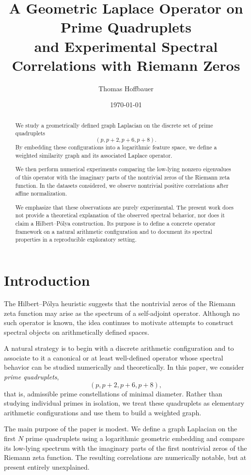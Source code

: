 \documentclass[11pt,a4paper]{article}
\title{
	A Geometric Laplace Operator on Prime Quadruplets\\
	and Experimental Spectral Correlations with Riemann Zeros
}
\author{
	Thomas Hoffbauer
}
\date{\today}
\begin{document}
	
	\maketitle
	
	\begin{abstract}
		We study a geometrically defined graph Laplacian on the discrete set of prime quadruplets
		\[
		(p,p+2,p+6,p+8).
		\]
		By embedding these configurations into a logarithmic feature space, we define a weighted similarity graph and its associated Laplace operator.
		
		We then perform numerical experiments comparing the low-lying nonzero eigenvalues of this operator with the imaginary parts of the nontrivial zeros of the Riemann zeta function. In the datasets considered, we observe nontrivial positive correlations after affine normalization.
		
		We emphasize that these observations are purely experimental. The present work does not provide a theoretical explanation of the observed spectral behavior, nor does it claim a Hilbert--P\'olya construction. Its purpose is to define a concrete operator framework on a natural arithmetic configuration and to document its spectral properties in a reproducible exploratory setting.
	\end{abstract}
	
	\section{Introduction}
	
	The Hilbert--P\'olya heuristic suggests that the nontrivial zeros of the Riemann zeta function may arise as the spectrum of a self-adjoint operator. Although no such operator is known, the idea continues to motivate attempts to construct spectral objects on arithmetically defined spaces.
	
	A natural strategy is to begin with a discrete arithmetic configuration and to associate to it a canonical or at least well-defined operator whose spectral behavior can be studied numerically and theoretically. In this paper, we consider \emph{prime quadruplets},
	\[
	(p,p+2,p+6,p+8),
	\]
	that is, admissible prime constellations of minimal diameter. Rather than studying individual primes in isolation, we treat these quadruplets as elementary arithmetic configurations and use them to build a weighted graph.
	
	The main purpose of the paper is modest. We define a graph Laplacian on the first \(N\) prime quadruplets using a logarithmic geometric embedding and compare its low-lying spectrum with the imaginary parts of the first nontrivial zeros of the Riemann zeta function. The resulting correlations are numerically notable, but at present entirely unexplained.
	
\end{document}
